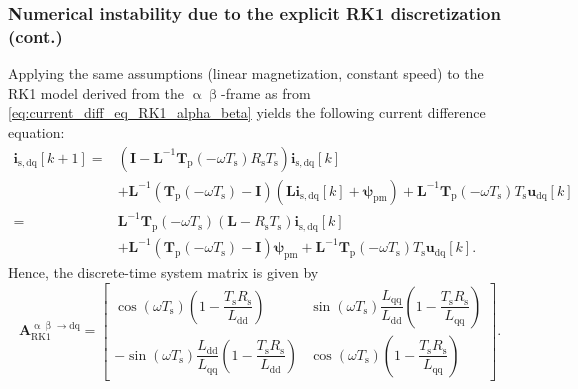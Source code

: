 \begin{frame}
    \frametitle{Numerical instability due to the explicit RK1 discretization (cont.)}
    Applying the same assumptions (linear magnetization, constant speed) to the RK1 model derived from the $\upalpha\upbeta$-frame as from \eqref{eq:current_diff_eq_RK1_alpha_beta} yields the following current difference equation:
    \begin{equation}
        \begin{split}
            \bm{i}_\mathrm{s,dq}[k+1] = & \left(\bm{I} - \bm{L}^{-1}\bm{T}_\mathrm{p}(-\omega T_\mathrm{s})R_\mathrm{s}T_\mathrm{s}\right)\bm{i}_\mathrm{s,dq}[k] \\ &+ \bm{L}^{-1}\left(\bm{T}_\mathrm{p}(-\omega T_\mathrm{s})-\bm{I}\right)\left(\bm{L}\bm{i}_\mathrm{s,dq}[k] + \bm{\psi}_\mathrm{pm}\right) + \bm{L}^{-1}\bm{T}_\mathrm{p}(-\omega T_\mathrm{s}) T_\mathrm{s}\bm{u}_{\mathrm{dq}}[k]\\
            =                           & \bm{L}^{-1}\bm{T}_\mathrm{p}(-\omega T_\mathrm{s})\left(\bm{L} - R_\mathrm{s}T_\mathrm{s}\right)\bm{i}_\mathrm{s,dq}[k] \\ &+ \bm{L}^{-1}\left(\bm{T}_\mathrm{p}(-\omega T_\mathrm{s})-\bm{I}\right)\bm{\psi}_\mathrm{pm} + \bm{L}^{-1}\bm{T}_\mathrm{p}(-\omega T_\mathrm{s}) T_\mathrm{s}\bm{u}_{\mathrm{dq}}[k].
        \end{split}
    \end{equation}\pause%
    Hence, the discrete-time system matrix is given by
    \begin{equation}
        \bm{A}_{\text{RK1}}^{\upalpha\upbeta\rightarrow\mathrm{dq}} = \begin{bmatrix}
            \cos\!\left(\omega T_\mathrm{s}\right)
            \left(1-\dfrac{T_\mathrm{s} R_\mathrm{s}}{L_{\mathrm{dd}}}\right)
             &
            \sin\!\left(\omega T_\mathrm{s}\right)
            \dfrac{L_{\mathrm{qq}}}{L_{\mathrm{dd}}}
            \left(1-\dfrac{T_\mathrm{s}R_\mathrm{s}}{L_{\mathrm{qq}}}\right)
            \\[2ex]
            -\sin\!\left(\omega T_\mathrm{s}\right)
            \dfrac{L_{\mathrm{dd}}}{L_{\mathrm{qq}}}
            \left(1-\dfrac{T_\mathrm{s}R_\mathrm{s}}{L_{\mathrm{dd}}}\right)
             &
            \cos\!\left(\omega T_\mathrm{s}\right)
            \left(1-\dfrac{T_\mathrm{s}R_\mathrm{s}}{L_{\mathrm{qq}}}\right)
        \end{bmatrix}.
        \label{eq:system_matrix_PMSM_RK1_alpha_beta}
    \end{equation}
\end{frame}

